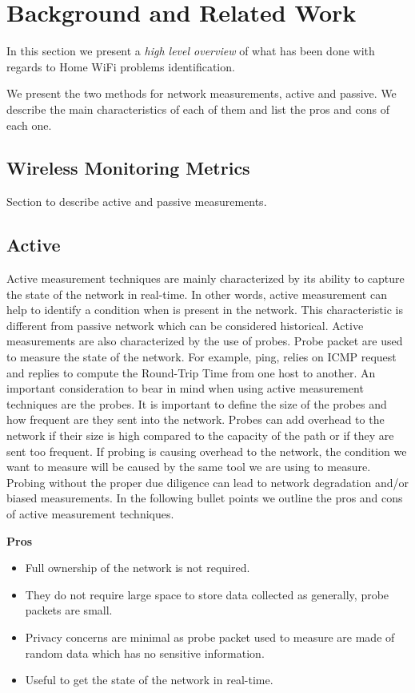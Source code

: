 \section{Background and Related Work}\label{Back_Related_Work}

In this section we present a \emph{high level overview} of what has been done with regards to Home WiFi problems identification.

We present the two methods for network measurements, active and passive. We describe the main characteristics of each of them and list the pros and cons of each one.

\subsection{Wireless Monitoring Metrics}

Section to describe active and passive measurements.

\subsection*{Active}

Active measurement techniques are mainly characterized by its ability to capture the state of the network in real-time. In other words, active measurement can help to identify a condition when is present in the network. This characteristic is different from passive network which can be considered historical. Active measurements are also characterized by the use of probes. Probe packet are used to measure the state of the network. For example, ping, relies on ICMP request and replies to compute the Round-Trip Time from one host to another. An important consideration to bear  in mind when using active measurement techniques are the probes. It is important to define the size of the probes and how frequent are they sent into the network. Probes can add overhead to the network if their size is high compared to the capacity of the path or if they are sent too frequent. If probing is causing overhead to the network, the condition we want to measure will be caused by the same tool we are using to measure. Probing without the proper due diligence can lead to network degradation and/or biased measurements. In the following bullet points we outline the pros and cons of active measurement techniques.

\textbf{Pros}
\begin{itemize}
	\item Full ownership of the network is not required.
	\item They do not require large space to store data collected as generally, probe packets are small.
	\item Privacy concerns are minimal as probe packet used to measure are made of random data which has no sensitive information.
	\item Useful to get the state of the network in real-time.
\end{itemize}
	

